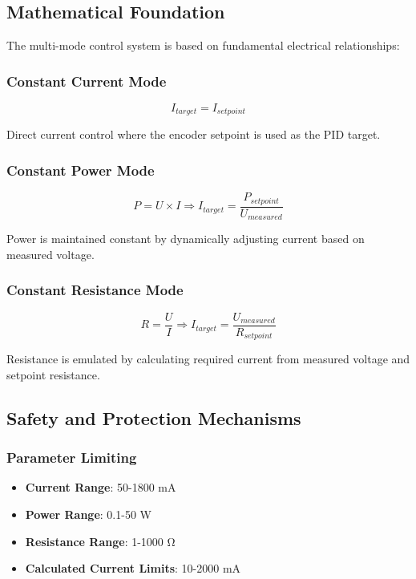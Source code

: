 \documentclass{article}
\begin{document}
\subsection{Mathematical Foundation}

The multi-mode control system is based on fundamental electrical relationships:

\subsubsection{Constant Current Mode}
\begin{equation}
I_{target} = I_{setpoint}
\end{equation}

Direct current control where the encoder setpoint is used as the PID target.

\subsubsection{Constant Power Mode}
\begin{equation}
P = U \times I \Rightarrow I_{target} = \frac{P_{setpoint}}{U_{measured}}
\end{equation}

Power is maintained constant by dynamically adjusting current based on measured voltage.

\subsubsection{Constant Resistance Mode}
\begin{equation}
R = \frac{U}{I} \Rightarrow I_{target} = \frac{U_{measured}}{R_{setpoint}}
\end{equation}

Resistance is emulated by calculating required current from measured voltage and setpoint resistance.

\subsection{Safety and Protection Mechanisms}

\subsubsection{Parameter Limiting}
\begin{itemize}
    \item \textbf{Current Range}: 50-1800 mA
    \item \textbf{Power Range}: 0.1-50 W
    \item \textbf{Resistance Range}: 1-1000 Ω
    \item \textbf{Calculated Current Limits}: 10-2000 mA
\end{itemize}
\end{document}
